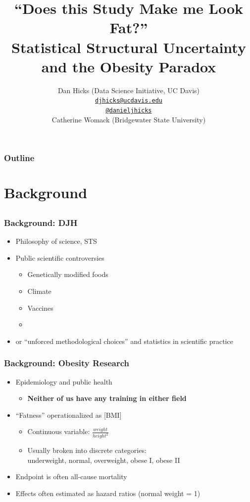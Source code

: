 \documentclass{philslides}
\newcommand{\talkurl}{\href{}{}}
\begin{document}
\date{}
\title{``Does this Study Make me Look Fat?''\\  Statistical Structural Uncertainty and the Obesity Paradox}
\author[Dan Hicks]{
	Dan Hicks (Data Science Initiative, UC Davis)\\
	{\scriptsize \href{mailto:djhicks@ucdavis.edu}{\texttt{djhicks@ucdavis.edu}}}\\ 
	{\scriptsize \href{https://twitter.com/danieljhicks}{\texttt{@danieljhicks}}}\\
	Catherine Womack (Bridgewater State University)
	}
\affiliation
	{}
	
\frame
{
	\titlepage
}

\frame
{
	\frametitle{Outline}
	\tableofcontents
}


\section{Background}
\subsection{}

\frame
{
	\frametitle{Background:  DJH}
	\begin{itemize}
	\item Philosophy of science, STS
	\item Public scientific controversies
		\begin{itemize}
		\item Genetically modified foods \autocite{Hicks2015, Hicks2016a}
		\item Climate \autocite{Hicks2017a}
		\item Vaccines \autocite{Hicks2017a}
		\item {}
		 \end{itemize}
	\item {} or ``unforced methodological choices'' \autocite{Winsberg2012} and statistics in scientific practice
	\end{itemize}
}
\frame
{
	\frametitle{Background: Obesity Research}
	\begin{itemize}
	\item Epidemiology and public health
		\begin{itemize}
		\item \textbf{Neither of us have any training in either field}
		\end{itemize}
	\item ``Fatness'' operationalized as  [BMI]
		\begin{itemize}
		\item Continuous variable:  $\displaystyle \frac{weight}{height^2}$
		\item Usually broken into discrete categories:\\
			underweight, normal, overweight, obese I, obese II
		\end{itemize}
	\item Endpoint is often all-cause mortality
	\item Effects often estimated as hazard ratios (normal weight = 1)
	\end{itemize}
}
\end{document}
